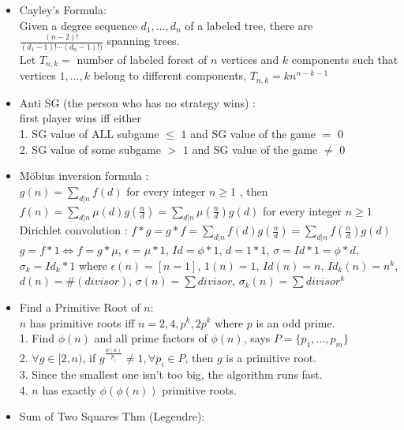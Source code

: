 \begin{itemize}[leftmargin=*]
\item Cayley's Formula:\\
  Given a degree sequence $d_1,\dots,d_n$ of a labeled tree, there are $\frac{(n-2)!}{(d_1-1)!\cdots(d_n-1)!)}$ spanning trees.\\
  Let $T_{n,k}=$ number of labeled forest of $n$ vertices and $k$ components such that vertices $1,\dots,k$ belong to different components, $T_{n,k}=kn^{n-k-1}$
\item Anti SG (the person who has no strategy wins) :\\
  first player wins iff either\\
  1. SG value of ALL subgame $\le$ $1$ and SG value of the game $=$ $0$\\
  2. SG value of some subgame $>$ $1$ and SG value of the game $\neq$ $0$
\item Möbius inversion formula :\\
  $g(n) = \sum\limits_{d|n}f(d)$ for every integer $n\ge 1$ , then\\
  $f(n) = \sum\limits_{d|n}\mu(d)g(\frac{n}{d}) = \sum\limits_{d|n}\mu(\frac{n}{d})g(d)$ for every integer $n\ge 1$\\
  Dirichlet convolution : $f*g=g*f=\sum\limits_{d|n}f(d)g(\frac{n}{d})=\sum\limits_{d|n}f(\frac{n}{d})g(d)$\\
  $g=f*1\Leftrightarrow f=g*\mu$, $\epsilon=\mu*1$, $Id=\phi*1$, $d=1*1$, $\sigma=Id*1=\phi*d$,\\
  $\sigma_k=Id_k*1$ where $\epsilon(n)=[n=1]$, $1(n)=1$, $Id(n)=n$, $Id_k(n)=n^k$,\\
  $d(n)=\#(divisor)$, $\sigma(n)=\sum divisor$, $\sigma_k(n)=\sum divisor^k$
\item Find a Primitive Root of $n$:\\
  $n$ has primitive roots iff $n=2,4,p^k,2p^k$ where $p$ is an odd prime.\\
  1. Find $\phi(n)$ and all prime factors of $\phi(n)$, says $P=\{p_1,...,p_m\}$\\
  2. $\forall g\in[2,n)$, if $g^{\frac{\phi(n)}{p_i}}\ne 1,\forall p_i\in P$, then $g$ is a primitive root.\\
  3. Since the smallest one isn't too big, the algorithm runs fast.\\
  4. $n$ has exactly $\phi(\phi(n))$ primitive roots.
\item Sum of Two Squares Thm (Legendre):\\

\end{itemize}
